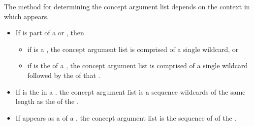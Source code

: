 \pnum
The method for determining the concept argument list depends on the
context in which   appears.
% 
\begin{itemize}
\item If  is part of a  or 
,
then
  \begin{itemize}
  \item if  is a , the concept 
  argument list is comprised of a single wildcard, or
  \item if  is the  of a 
  , the concept argument list is comprised of a
  single wildcard followed by the  of that 
  .
  \end{itemize}

\item If  is the  in a
. the concept argument list is a sequence 
wildcards of the same length as the  of
the .

\item If  appears as a  of a
, the concept argument list is the sequence of
 of the .
\end{itemize}


